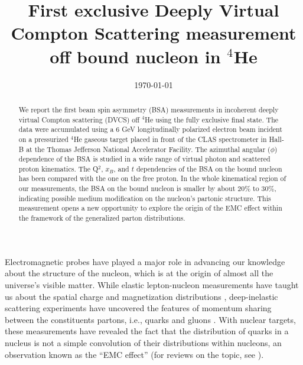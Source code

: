\documentclass[twocolumn,nofootinbib,showpacs,prl,superscriptaddress,secnumarabic,amssymb,nobibnotes,aps,floatfix]{revtex4}
\begin{document}
\linenumbers

\title{First exclusive Deeply Virtual Compton Scattering measurement off bound nucleon in $^4$He}



\date{\today}
\begin{abstract}
 We report the first beam spin asymmetry (BSA) measurements in incoherent 
 deeply virtual Compton scattering (DVCS) off $^4$He using the fully exclusive 
 final state. The data were accumulated using a 6 GeV longitudinally polarized 
 electron beam incident on a pressurized $^4$He gaseous target placed in front 
 of the CLAS spectrometer in Hall-B at the Thomas Jefferson National 
 Accelerator Facility. The azimuthal angular ($\phi$) dependence of the BSA is 
 studied in a wide range of virtual photon and scattered proton 
 kinematics. The Q$^2$, $x_B$, and $t$ dependencies of the BSA on the bound nucleon has 
 been compared with the one on the free proton. In the whole kinematical region of our 
 measurements, the BSA on the bound nucleon is smaller by about $20\%$ to $30\%$, 
 indicating possible medium modification on the nucleon's partonic structure.  
 This measurement opens a new opportunity to explore the origin of the EMC 
 effect within the framework of the generalized parton distributions.

\end{abstract}

\maketitle 

Electromagnetic probes have played a major role in advancing our knowledge 
about the structure of the nucleon, which is at the origin of almost all the
universe's visible matter. While elastic lepton-nucleon measurements have 
taught us about the spatial charge and magnetization distributions 
\cite{Hofstadter:1955ae,Perdrisat:2006hj}, deep-inelastic scattering 
experiments have uncovered the features of momentum sharing between the 
constituents partons, i.e., quarks and gluons \cite{Dokshitzer:1977sg,pdg}.  
With nuclear targets, these measurements have revealed the fact that the 
distribution of quarks in a nucleus is not a simple convolution of 
their distributions within nucleons, an observation known as the ``EMC 
effect''\cite{EMC_first} (for reviews on the topic, see  
\cite{EMC_CERN,EMC_SLAC,EMC_HERMES,EMC_JLab,EMC_John,EMC_mdeium_1,EMC_medium_2}).
\end{document}

